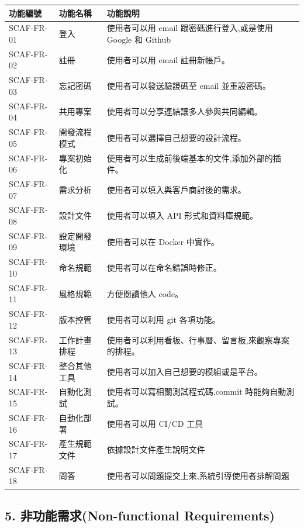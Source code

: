 \documentclass{report}
\begin{document}
\begin{tabularx}{\textwidth}{
  |p{}%
  |p{}%
  |p{}|%
}
  \hline
  功能編號 & 功能名稱 & 功能說明 \\ \hline
  SCAF-FR-01 & 登入 & 使用者可以用 email 跟密碼進行登入,或是使用 Google 和 Github \\ \hline
  SCAF-FR-02 & 註冊 & 使用者可以用 email 註冊新帳戶。 \\ \hline
  SCAF-FR-03 & 忘記密碼 & 使用者可以發送驗證碼至 email 並重設密碼。 \\ \hline
  SCAF-FR-04 & 共用專案 & 使用者可以分享連結讓多人參與共同編輯。 \\ \hline
  SCAF-FR-05 & 開發流程模式 & 使用者可以選擇自己想要的設計流程。 \\ \hline
  SCAF-FR-06 & 專案初始化 & 使用者可以生成前後端基本的文件,添加外部的插件。 \\ \hline
  SCAF-FR-07 & 需求分析 & 使用者可以填入與客戶商討後的需求。 \\ \hline
  SCAF-FR-08 & 設計文件 & 使用者可以填入 API 形式和資料庫規範。 \\ \hline
  SCAF-FR-09 & 設定開發環境 & 使用者可以在 Docker 中實作。 \\ \hline
  SCAF-FR-10 & 命名規範 & 使用者可以在命名錯誤時修正。 \\ \hline
  SCAF-FR-11 & 風格規範 & 方便閱讀他人 code。 \\ \hline
  SCAF-FR-12 & 版本控管 & 使用者可以利用 git 各項功能。 \\ \hline
  SCAF-FR-13 & 工作計畫排程 & 使用者可以利用看板、行事曆、留言板,來觀察專案的排程。 \\ \hline
  SCAF-FR-14 & 整合其他工具 & 使用者可以加入自己想要的模組或是平台。 \\ \hline
  SCAF-FR-15 & 自動化測試 & 使用者可以寫相關測試程式碼,commit 時能夠自動測試。 \\ \hline
  SCAF-FR-16 & 自動化部署 & 使用者可以用 CI/CD 工具 \\ \hline
  SCAF-FR-17 & 產生規範文件 & 依據設計文件產生說明文件 \\ \hline
  SCAF-FR-18 & 問答 & 使用者可以問題提交上來,系統引導使用者排解問題 \\ \hline
\end{tabularx}

\subsection*{5. 非功能需求(Non-functional Requirements)}
\end{document}
